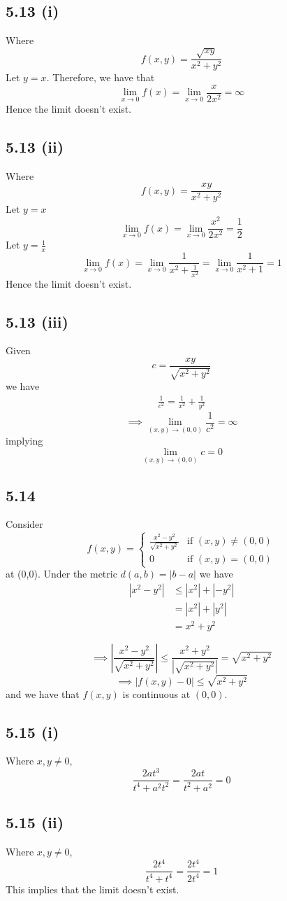 \documentclass[letterpaper,12pt]{article}
\theoremstyle{definition}
\begin{document}
\subsection*{5.13 (i)}

        Where \[f(x,y) = \frac{\sqrt{xy}}{x^2+y^2}\]
        Let $y = x$. Therefore, we have that
        \[\lim_{x \rightarrow 0}f(x) = \lim_{x \rightarrow 0 } \frac{x}{2x^2} = \infty \]
        Hence the limit doesn't exist.
\subsection*{5.13 (ii)}
        Where \[f(x,y) = \frac{xy}{x^2+y^2}\]
        Let $y=x$ 
        \[\lim_{x \rightarrow 0}f(x) = \lim_{x \rightarrow 0 } \frac{x^2}{2x^2} = \frac{1}{2} \]
        Let $ y = \frac{1}{x}$ 
        \[\lim_{x \rightarrow 0}f(x) = \lim_{x \rightarrow 0 } \frac{1}{x^2 + \frac{1}{x^2}} = \lim_{x \rightarrow 0 } \frac{1}{x^2 +1} = 1 \]
        Hence the limit doesn't exist.
\subsection*{5.13 (iii)}
Given
        \[
        c = \frac{xy}{\sqrt{x^2+y^2}}
        \]
        we have
        \begin{align*}
            \frac{1}{c^2} = \frac{1}{x^2} + \frac{1}{y^2}
        \end{align*}
        \[\implies \lim_{(x,y) \rightarrow (0,0)} \frac{1}{c^2} = \infty\]
        implying
        \[\lim_{(x,y) \rightarrow (0,0)} c = 0\]
\subsection*{5.14}
Consider 
\[  f(x,y) = \begin{cases} \frac{x^2 - y^2}{\sqrt{x^2 + y^2}} & \text{if } (x,y) \neq (0,0) \\ 0 & \text{if } (x,y) = (0,0) \end{cases} \]
at (0,0).
Under the metric $d(a,b) = |b-a|$ we have
\begin{align*}
    |x^2 - y^2| &\leq |x^2| + |-y^2| \\
    &= |x^2| + |y^2| \\
    &= x^2 + y^2
\end{align*}

\[\implies  \left| \frac{x^2 - y^2}{\sqrt{ x^2 + y^2}} \right| \leq \frac{x^2 + y^2}{|\sqrt{ x^2 + y^2}|} = \sqrt{x^2 + y^2}  \]
\[\implies  |f(x,y) - 0| \leq \sqrt{x^2 + y^2}\]
and we have that $f(x,y)$ is continuous at $(0,0)$.

\subsection*{5.15 (i)}

Where $x, y \neq 0$,
        \[\frac{2at^3}{t^4+a^2t^2} = \frac{2at}{t^2 + a^2} = 0\]
\subsection*{5.15 (ii)}
Where $x,y \neq 0$,
        \[\frac{2t^4}{t^4+t^4} = \frac{2t^4}{2t^4} = 1 \]
This implies that the limit doesn't exist.
\end{document}
